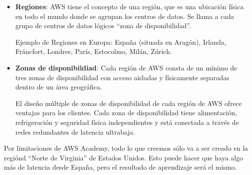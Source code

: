 \begin{itemize}
	\item \textbf{Regiones}: AWS tiene el concepto de una región, que es una ubicación física en todo el mundo donde se agrupan los centros de datos. Se llama a cada grupo de centros de datos lógicos “zona de disponibilidad”. 
	
	Ejemplo de Regiones en Europa: España (situada en Aragón), Irlanda, Fráncfort, Londres, París, Estocolmo, Milán, Zúrich.
	
	\item \textbf{Zonas de disponibildiad}: Cada región de AWS consta de un mínimo de tres zonas de disponibilidad con acceso aisladas y físicamente separadas dentro de un área geográfica. 
	
	El diseño múltiple de zonas de disponibilidad de cada región de AWS ofrece ventajas para los clientes. Cada zona de disponibilidad tiene alimentación, refrigeración y seguridad física independientes y está conectada a través de redes redundantes de latencia ultrabaja.
	
	
\end{itemize}


Por limitaciones de AWS Academy, todo lo que creemos sólo va a ser creado en la regiónd “Norte de Virginia” de Estados Unidos. Esto puede hacer que haya algo más de latencia desde España, pero el resultado de aprendizaje será el mismo.
